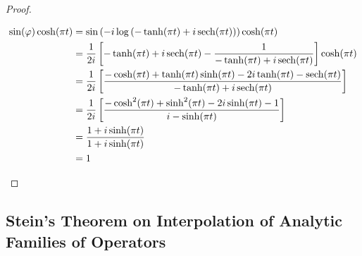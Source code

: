 \begin{proof}
\begin{enumerate}[label = \textbf{(\roman*.)}]
\begin{enumerate}[label = \textbf{\alph*.}]
				\begin{gather*}
					\begin{aligned}
						\sin(\varphi)\cosh(\pi t) &= \sin\left( -i\log\left( -\tanh (\pi t) + i \operatorname{sech}(\pi t) \right)\right) \cosh(\pi t)\\
						&= \frac{1}{2i} \left[ -\tanh(\pi t) + i\operatorname{sech}(\pi t) - \frac{1}{-\tanh(\pi t) + i\operatorname{sech}(\pi t) }\right]\cosh(\pi t)\\
						&= \frac{1}{2i} \left[ \frac{-\cosh(\pi t) + \tanh(\pi t) \sinh(\pi t) - 2i\tanh(\pi t) - \operatorname{sech}(\pi t)}{-\tanh(\pi t) + i\operatorname{sech}(\pi t)}\right]\\
						&= \frac{1}{2i} \left[ \frac{- \cosh^2(\pi t) + \sinh^2(\pi t) - 2i \sinh(\pi t) - 1}{i - \sinh(\pi t)}\right]\\
						&= \frac{1 + i\sinh(\pi t)}{1 + i\sinh(\pi t)}\\
						&= 1
					\end{aligned}
				\end{gather*}

	\end{enumerate}
\end{enumerate}
\end{proof}

\subsection{Stein's Theorem on Interpolation of Analytic Families of Operators}

